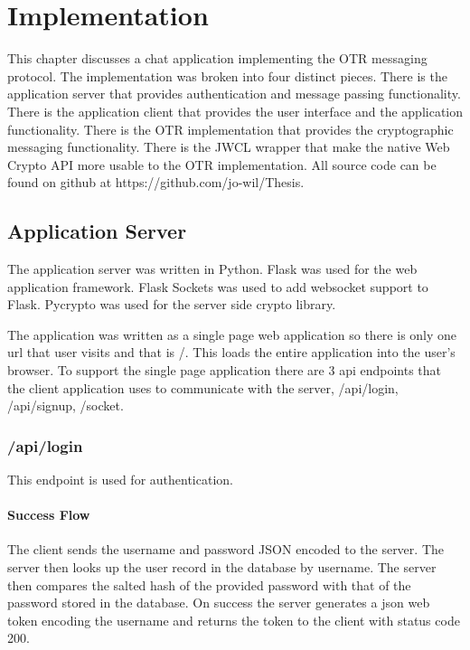 \chapter{Implementation}


This chapter discusses a chat application implementing the OTR messaging protocol. The implementation was broken into four distinct pieces. There is the application server that provides authentication and message passing functionality. There is the application client that provides the user interface and the application functionality. There is the OTR implementation that provides the cryptographic messaging functionality. There is the JWCL wrapper that make the native Web Crypto API more usable to the OTR implementation. All source code can be found on github at https://github.com/jo-wil/Thesis.


\section{Application Server}


The application server was written in Python. Flask was used for the web application framework. \cite{flask} Flask Sockets was used to add websocket support to Flask. \cite{flask-sockets} Pycrypto was used for the server side crypto library. \cite{pycrypto}


The application was written as a single page web application so there is only one url that user visits and that is /. This loads the entire application into the user's browser. To support the single page application there are 3 api endpoints that the client application uses to communicate with the server, /api/login, /api/signup, /socket.


\subsection{/api/login}


This endpoint is used for authentication. 


\subsubsection{Success Flow}


The client sends the username and password JSON encoded to the server. The server then looks up the user record in the database by username. The server then compares the salted hash of the provided password with that of the password stored in the database. On success the server generates a json web token encoding the username and returns the token to the client with status code 200.


